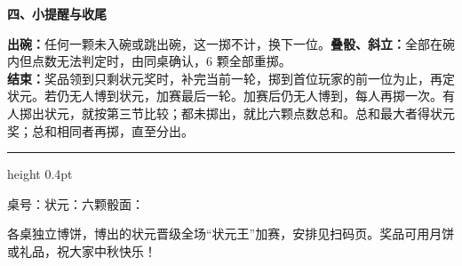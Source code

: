 \documentclass[11pt,a4paper,fontset=none]{ctexart}
\newcommand{\shead}[2]{\par\vspace{7pt}%
  {\fontsize{12.5}{17}\selectfont\bfseries\sffamily
  #1、#2\hspace{10pt}{\color{rulegray}\leaders\hrule height 0.3pt\hfill}\kern0pt\par}\vspace{4pt}}
\begin{document}
\shead{四}{小提醒与收尾}
\textbf{出碗：}任何一颗未入碗或跳出碗，这一掷不计，换下一位。\textbf{叠骰、斜立：}全部在碗内但点数无法判定时，由同桌确认，6 颗全部重掷。\\
\textbf{结束：}奖品领到只剩状元奖时，补完当前一轮，掷到首位玩家的前一位为止，再定状元。若仍无人博到状元，加赛最后一轮。加赛后仍无人博到，每人再掷一次。有人掷出状元，就按第三节比较；都未掷出，就比六颗点数总和。总和最大者得状元奖；总和相同者再掷，直至分出。

\vspace{7pt}\hrule height 0.4pt\vspace{5pt}
{\fontsize{10}{15}\selectfont
桌号：\underline{\hspace{1.2cm}}\quad 状元：\underline{\hspace{2.4cm}}\quad 六颗骰面：\underline{\hspace{3.4cm}}\par}
\vspace{3pt}
{\fontsize{9}{12}\selectfont 各桌独立博饼，博出的状元晋级全场“状元王”加赛，安排见扫码页。奖品可用月饼或礼品，祝大家中秋快乐！\par}
\end{document}
